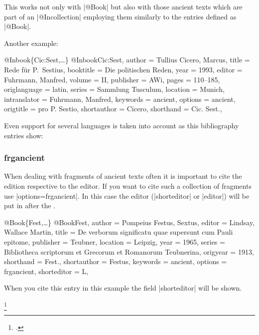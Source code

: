 \documentclass[a4paper,
10pt,
greek,
french,
spanish,
italian,
ngerman,
english
]{ltxdoc}
\begin{document}
This works not only with |@Book| but also with those ancient texts which are part of an |@Incollection| employing them similarly to the entries defined as |@Book|.

Another example:
\begin{bibexample}[label=Cic:Sest]{{@}Inbook\{Cic:Sest,…\}}
@Inbook{Cic:Sest,
  author       = {Tullius Cicero, Marcus},
  title        = {Rede für P.\ Sestius},
  booktitle    = {Die politischen Reden},
  year         = {1993},
  editor       = {Fuhrmann, Manfred},
  volume       = {II},
  publisher    = AWi,    %
  pages        = {110--185},
  origlanguage = {latin},
  series       = {Sammlung Tusculum},
  location     = Munich,      %
  intranslator = {Fuhrmann, Manfred},
  keywords     = {ancient},
  options      = {ancient},
  origtitle    = {pro P. Sestio},
  shortauthor  = {Cicero},
  shorthand    = {Cic. Sest.},
}
\end{bibexample}

Even support for several languages is taken into account as this bibliography entries show: 

\subsubsection{frgancient}\label{frgancient}
When dealing with fragments of ancient texts often it is important to cite the edition respective to the editor.
If you want to cite such a collection of fragments use |options={frgancient}|.
In this case the editor (|shorteditor| or |editor|) will be put in after the . 

\begin{bibexample}[label=Fest]{{@}Book\{Fest,…\}}
@Book{Fest,
  author      = {Pompeius Festus, {\relax Sex}tus},
  editor      = {Lindsay, Wallace Martin},
  title       = {De verborum significatu quae supersunt cum Pauli epitome},
  publisher   = {Teubner},
  location    = Leipzig,     %
  year        = {1965},
  series      = {Bibliotheca scriptorum et Grecorum et Romanorum Teubnerina},
  origyear    = {1913},
  shorthand   = {Fest.},
  shortauthor = {Festus},
  keywords    = {ancient},
  options     = {frgancient},
  shorteditor = {L},
}
\end{bibexample}

When you cite this entry in this example the field  |shorteditor| will be shown.
\begin{example}
\footnote{\cite[3]{Fest}.}
\end{example}
\end{document}
